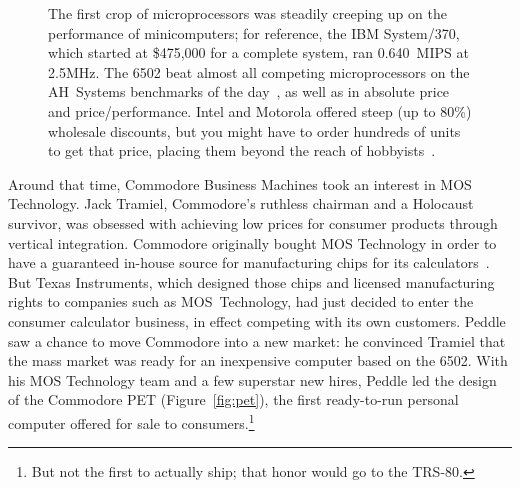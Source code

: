 \begin{figure}
  
  \caption{\label{fig:price_performance} 
    The first crop of microprocessors was steadily creeping up on the
    performance of minicomputers; for reference, the IBM System/370,
    which started at \$475,000 for a complete system, ran 0.640~MIPS at
    2.5MHz. 
    The 6502 beat almost all competing microprocessors on the AH~Systems benchmarks of
    the day~\cite{edn75:6502}, as well as in absolute price and price/performance.
    Intel and Motorola offered steep (up to 80\%) wholesale discounts,
    but you might have to order hundreds of units to
    get that price, placing them beyond the reach of hobbyists~\cite[p. 228]{ceruzzi}.}
\end{figure}




Around that time, Commodore Business Machines took an interest in MOS
Technology.
Jack Tramiel, Commodore's ruthless chairman and a Holocaust survivor,
was obsessed with achieving low prices for consumer products through
vertical integration.
Commodore originally bought MOS Technology in order to have a
guaranteed in-house source for manufacturing chips for its
calculators~\cite{commodore}.
But Texas Instruments, which designed those chips and licensed
manufacturing rights to companies such as MOS~Technology, had just
decided to enter the consumer calculator business, in effect competing
with its own customers.
Peddle saw a chance to move Commodore into a new market: he convinced
Tramiel that the mass market was ready for an inexpensive computer based on
the 6502.
With his MOS Technology team and a few superstar new hires, Peddle led
the design of the Commodore PET (Figure~\ref{fig:pet}), the first
ready-to-run personal computer offered for sale to consumers.\footnote{But not
the first to actually ship; that honor would go to the TRS-80.}


